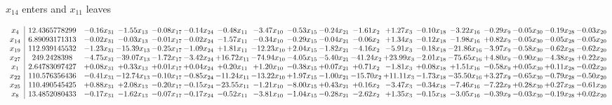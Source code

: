 \documentclass[9pt]{article}
\begin{document}
 $ x_{14} $ enters and $ x_{11} $ leaves 

 \[\begin{array}{c| c c@{\hskip 2pt} c@{\hskip 2pt} c@{\hskip 2pt} c@{\hskip 2pt} c@{\hskip 2pt} c@{\hskip 2pt} c@{\hskip 2pt} c@{\hskip 2pt} c@{\hskip 2pt} c@{\hskip 2pt} c@{\hskip 2pt} c@{\hskip 2pt} c@{\hskip 2pt} c@{\hskip 2pt} c@{\hskip 2pt} c@{\hskip 2pt} }
 x_{4}   &  12.4365778299 & -0.16 x_{31} & -1.55 x_{13} & -0.08 x_{17} & -0.14 x_{24} & -0.48 x_{11} & -3.47 x_{10} & -0.53 x_{15} & -0.24 x_{21} & -1.61 x_{2} & +  1.27 x_{3} & -0.10 x_{18} & -3.22 x_{16} & -0.29 x_{9} & -0.05 x_{30} & -0.19 x_{28} & -0.03 x_{20}\\
 x_{14}   &  6.89093171313 & -0.02 x_{31} & -0.03 x_{13} & -0.01 x_{17} & -0.02 x_{24} & -1.57 x_{11} & -0.34 x_{10} & -0.29 x_{15} & -0.04 x_{21} & -0.06 x_{2} & +  1.34 x_{3} & -0.12 x_{18} & -1.98 x_{16} & +  0.82 x_{9} & -0.05 x_{30} & -0.05 x_{28} & -0.05 x_{20}\\
 x_{19}   &  112.939145532 & -1.23 x_{31} & -15.39 x_{13} & -0.25 x_{17} & -1.09 x_{24} & +  1.81 x_{11} & -12.23 x_{10} & +  2.04 x_{15} & -1.82 x_{21} & -4.16 x_{2} & -5.91 x_{3} & -0.18 x_{18} & -21.86 x_{16} & -3.97 x_{9} & -0.58 x_{30} & -0.62 x_{28} & -0.62 x_{20}\\
 x_{27}   &  249.2428398 & -4.75 x_{31} & -39.07 x_{13} & -1.72 x_{17} & -3.42 x_{24} & + 16.72 x_{11} & -74.94 x_{10} & -4.05 x_{15} & -5.40 x_{21} & -41.24 x_{2} & + 23.99 x_{3} & -2.01 x_{18} & -75.65 x_{16} & +  4.80 x_{9} & -0.90 x_{30} & -4.38 x_{28} & +  0.22 x_{20}\\
 x_{1}   &  2.64783097427 & +  0.08 x_{31} & +  0.33 x_{13} & +  0.01 x_{17} & +  0.04 x_{24} & +  0.20 x_{11} & +  1.20 x_{10} & -0.38 x_{15} & +  0.07 x_{21} & +  0.71 x_{2} & -1.81 x_{3} & +  0.08 x_{18} & +  1.51 x_{16} & -0.58 x_{9} & +  0.05 x_{30} & +  0.11 x_{28} & -0.02 x_{20}\\
 x_{22}   &  110.576356436 & -0.41 x_{31} & -12.74 x_{13} & -0.10 x_{17} & -0.85 x_{24} & -11.24 x_{11} & -13.22 x_{10} & +  1.97 x_{15} & -1.00 x_{21} & -15.70 x_{2} & + 11.11 x_{3} & -1.73 x_{18} & -35.50 x_{16} & +  3.27 x_{9} & -0.65 x_{30} & -0.79 x_{28} & -0.50 x_{20}\\
 x_{25}   &  110.490545425 & +  0.88 x_{31} & +  2.08 x_{13} & -0.20 x_{17} & -0.15 x_{24} & -23.55 x_{11} & -1.21 x_{10} & -8.00 x_{15} & +  0.43 x_{21} & +  0.16 x_{2} & -3.47 x_{3} & -0.34 x_{18} & -7.46 x_{16} & -7.22 x_{9} & +  0.28 x_{30} & +  0.27 x_{28} & -0.61 x_{20}\\
 x_{8}   &  13.4852080433 & -0.17 x_{31} & -1.62 x_{13} & -0.07 x_{17} & -0.17 x_{24} & -0.52 x_{11} & -3.81 x_{10} & -1.04 x_{15} & -0.28 x_{21} & -2.62 x_{2} & +  1.35 x_{3} & -0.15 x_{18} & -3.05 x_{16} & -0.39 x_{9} & -0.03 x_{30} & -0.19 x_{28} & +  0.02 x_{20}\\

\end{array}\]
\end{document}
